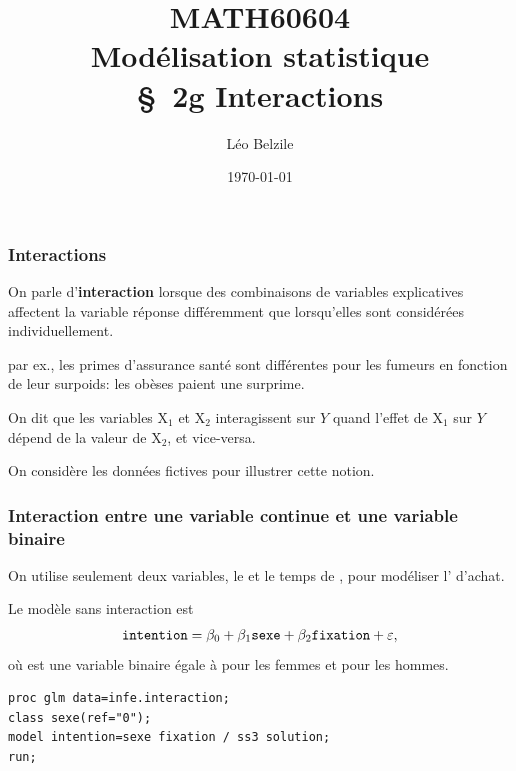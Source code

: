 \documentclass[xcolor={dvipsnames}]{beamer}
\title[\color{white}{MATH60604 \S~2g Interactions}]{MATH60604 \\Modélisation statistique \\ \S~2g Interactions}
\author{Léo Belzile}
\date{\today}
\institute{HEC Montréal\\
Département de sciences de la décision}
\date{}
\begin{document}
\frame{\titlepage}
\begin{frame}
 \frametitle{Interactions}
 \bi 
 \item On parle d'\textbf{interaction} lorsque des combinaisons de variables explicatives affectent la variable réponse différemment que lorsqu'elles sont considérées individuellement.
 \item par ex., les primes d'assurance santé sont différentes pour les fumeurs en fonction de leur surpoids: les obèses paient une surprime.
\item On dit que les variables $\mathrm{X}_1$ et $\mathrm{X}_2$ interagissent sur $Y$ quand \alert{l'effet de $\mathrm{X}_1$ sur $Y$ dépend de la valeur de $\mathrm{X}_2$, et vice-versa}.
  \item On considère les données fictives  pour illustrer cette notion.
  \ei
 \end{frame}
 
\begin{frame}[fragile]
\frametitle{Interaction entre une variable continue et une variable binaire}
\bi
\item On utilise seulement deux variables, le  et le temps de , pour modéliser l' d'achat. 
\item Le modèle sans interaction est
\begin{align*}
\texttt{intention}=\beta_0 + \beta_1 \texttt{sexe} + \beta_2 \texttt{fixation} + \varepsilon,
\end{align*}
où  est une variable binaire égale à  pour les femmes et  pour les hommes.
\ei
\begin{tcolorbox}[colback=white,colframe=hecblue,title=code \SASlang pour ajuster un modèle linéaire]
\begin{verbatim}
proc glm data=infe.interaction;
class sexe(ref="0");
model intention=sexe fixation / ss3 solution;
run;
\end{verbatim}
\end{tcolorbox}
\end{frame}
\end{document}
